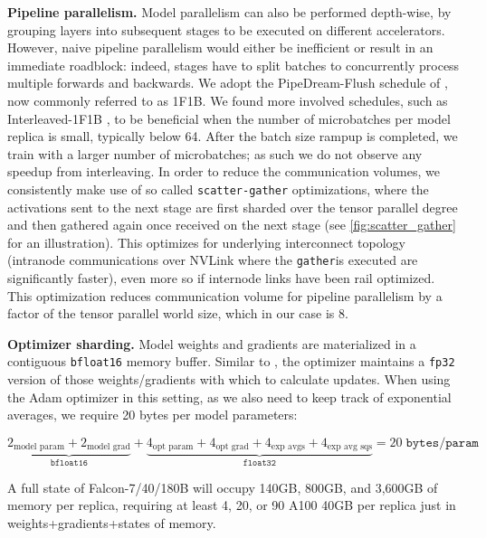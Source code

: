 \documentclass{article}
\begin{document}
\textbf{Pipeline parallelism.} Model parallelism can also be performed depth-wise, by grouping layers into subsequent stages to be executed on different accelerators. However, naive pipeline parallelism would either be inefficient or result in an immediate roadblock: indeed, stages have to split batches to concurrently process multiple forwards and backwards. We adopt the PipeDream-Flush schedule of \citet{pipedream}, now commonly referred to as 1F1B. We found more involved schedules, such as Interleaved-1F1B \citep{megatron-2}, to be beneficial when the number of microbatches per model replica is small, typically below 64. After the batch size rampup is completed, we train with a larger number of microbatches; as such we do not observe any speedup from interleaving. In order to reduce the communication volumes, we consistently make use of so called \texttt{scatter-gather} optimizations, where the activations sent to the next stage are first sharded over the tensor parallel degree and then gathered again once received on the next stage (see \cref{fig:scatter_gather} for an illustration). This optimizes for underlying interconnect topology (intranode communications over NVLink where the \texttt{gather}is executed are significantly faster), even more so if internode links have been rail optimized. This optimization reduces communication volume for pipeline parallelism by a factor of the tensor parallel world size, which in our case is 8. 

\textbf{Optimizer sharding.} Model weights and gradients are materialized in a contiguous \texttt{bfloat16} memory buffer. Similar to \citep{gopher}, the optimizer maintains a \texttt{fp32} version of those weights/gradients with which to calculate updates. When using the Adam optimizer in this setting, as we also need to keep track of exponential averages, we require 20 bytes per model parameters:

\begin{equation}
\underbrace{2_{\text{model param}} + 2_{\text{model grad}}}_{\texttt{bfloat16}} + \underbrace{4_{\text{opt param}} + 4_{\text{opt grad}} + 4_{\text{exp avgs}} + 4_{\text{exp avg sqs}}}_{\texttt{float32}} = 20\; \texttt{bytes}/\texttt{param}
\label{mem_usage}
\end{equation}

A full state of Falcon-7/40/180B will occupy 140GB, 800GB, and 3,600GB of memory per replica, requiring at least 4, 20, or 90 A100 40GB per replica just in weights+gradients+states of memory.
\end{document}
